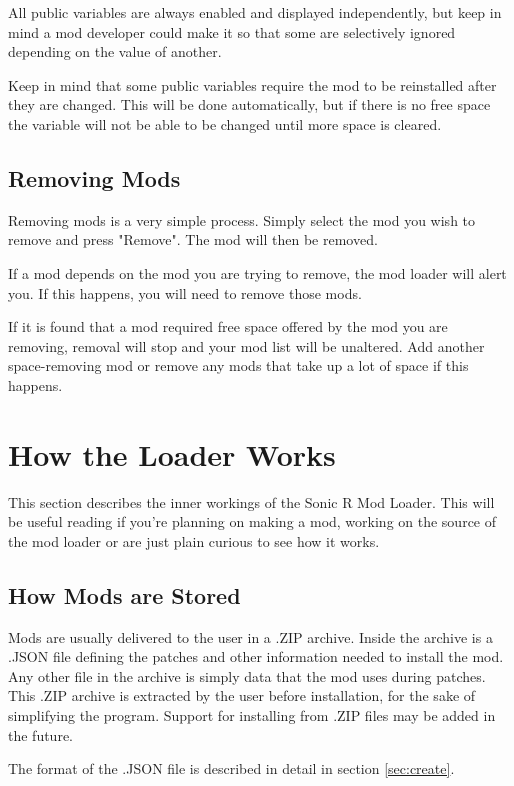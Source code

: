 \documentclass[12pt,a4paper,notitlepage]{article}
\begin{document}
All public variables are always enabled and displayed independently, but keep in mind a mod developer could make it so that some are selectively ignored depending on the value of another.

Keep in mind that some public variables require the mod to be reinstalled after they are changed. This will be done automatically, but if there is no free space the variable will not be able to be changed until more space is cleared.

\subsection{Removing Mods}
\label{subsec:using-uninstall}
Removing mods is a very simple process. Simply select the mod you wish to remove and press "Remove". The mod will then be removed.

If a mod depends on the mod you are trying to remove, the mod loader will alert you. If this happens, you will need to remove those mods.

If it is found that a mod required free space offered by the mod you are removing, removal will stop and your mod list will be unaltered. Add another space-removing mod or remove any mods that take up a lot of space if this happens.

\pagebreak
\section{How the Loader Works}
\label{sec:works}
This section describes the inner workings of the Sonic R Mod Loader. This will be useful reading if you're planning on making a mod, working on the source of the mod loader or are just plain curious to see how it works.

\subsection{How Mods are Stored}
\label{subsec:works-store}
Mods are usually delivered to the user in a .ZIP archive. Inside the archive is a .JSON file defining the patches and other information needed to install the mod. Any other file in the archive is simply data that the mod uses during patches. This .ZIP archive is extracted by the user before installation, for the sake of simplifying the program. Support for installing from .ZIP files may be added in the future.

The format of the .JSON file is described in detail in section \ref{sec:create}.
\end{document}
